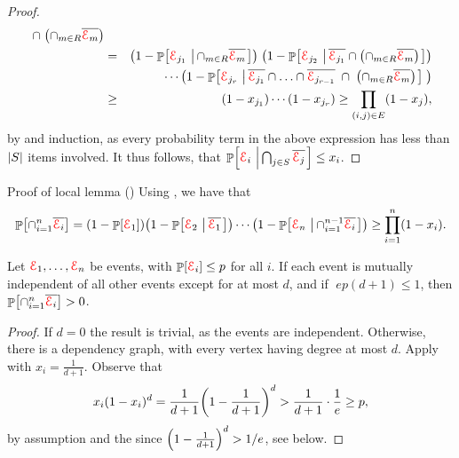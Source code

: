 \begin{proof}
\begin{eqnarray*}
{{              \;\cap \; \pth{ \cap_{m \in R} \overline{\Event_m}}}} \\
        &=& 
        \pth{1 - \Prob{{\Event_{j_1}} \sep{
                 \cap_{m \in R} \overline{\Event_m}}}} \;
        \pth{ 1 - \Prob{{\Event_{j_2}} \sep{ \overline{\Event_{j_1}} \cap
                 \pth{ \cap_{m \in R} \overline{\Event_m}}}}} \\
        &&\cdots 
        \pth{ 1 - \Prob{{\Event_{j_r}} \sep{ \overline{\Event_{j_1}} \cap
                 \ldots \cap \overline{\Event_{j_{r-1}}} \;\cap\;
                 \pth{ \cap_{m \in R} \overline{\Event_m}}}} \;} \\
        &\geq& \pth{1 -x_{j_1}} \cdots \pth{1 - x_{j_r}}
        \geq \prod_{(i,j) \in E} \pth{1 -x_j},
    \end{eqnarray*}
    by  and induction, as every probability term
    in the above expression has less than $\left| {S} \right|$ items
    involved. It thus follows, that 
    $\Prob{\Event_i \sep{\bigcap_{j \in S} \overline{\Event_j}}} \leq
    x_i$. 
\end{proof}


\noindent\begin{proofExt}{Proof of \Lovasz{} local lemma
       ()} Using , we have that
    \begin{align*}
    \Prob{\cap_{i=1}^{n} \overline{\Event_i}} = \pth{1 -
       \Prob{\Event_1}} \pth{1 - \Prob{\Event_2 \sep{\overline{\Event_1}}}}
    \cdots \pth{1 - \Prob{\Event_n \sep{ \cap_{i=1}^{n-1}
             \overline{\Event_{i}}}}} \geq
    \prod_{i=1}^{n} \pth{1-x_i}.
    \end{align*}   
\end{proofExt}

\bigskip

\begin{corollary}%
    Let ${\textcolor{red}{\EuScript{E}}}_1, \ldots, {\textcolor{red}{\EuScript{E}}}_n$ be events, with $\Prob{\Event_i} \leq
    p$ for all $i$. If each event is mutually independent of
    all other events except for at most $d$, and if
    $\;e p(d+1)\leq 1$, then $\Prob{\cap_{i=1}^{n}
       \overline{\Event_{i}}} > 0$.    
\end{corollary}

\begin{proof}
    If $d = 0$ the result is trivial, as the events are
    independent. Otherwise, there is a dependency graph,
    with every vertex having degree at most $d$. Apply
     with $x_i = \frac{1}{d+1}$. Observe that
    \begin{align*}
    x_i (1-x_i)^{d} =\frac{1}{d+1}\pth{1- \frac{1}{d+1}}^d
    > \frac{1}{d+1} \cdot \frac{1}{e} \geq p,
    \end{align*}
    by assumption and the since $\pth[]{1- \frac{1}{d+1}}^d >
    1/e$, see 
     below.
\end{proof}

